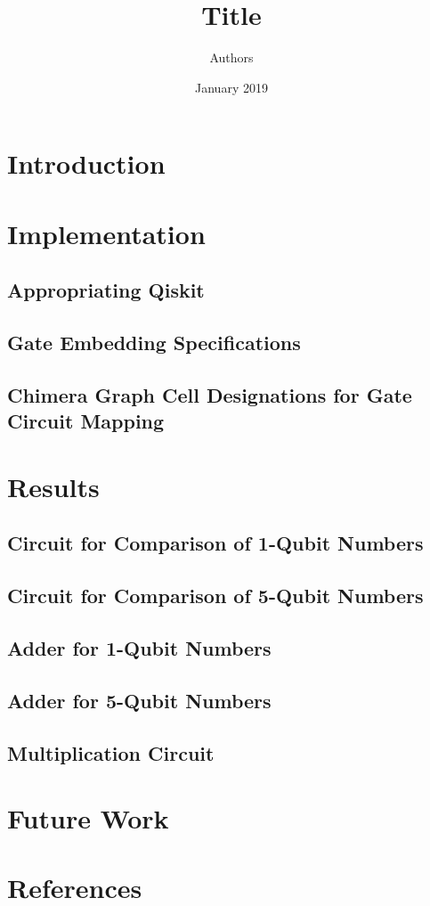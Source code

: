 \documentclass[12 pt, english]{article}
\title{Title}
\author{Authors}
\date{January 2019}
\begin{document}
\maketitle
\begin{abstract}

    
\end{abstract}
\section{Introduction}

\section{Implementation}
\subsection{Appropriating Qiskit}
\subsection{Gate Embedding Specifications}
\subsection{Chimera Graph Cell Designations for Gate Circuit Mapping}

\section{Results}

\subsection{Circuit for Comparison of 1-Qubit Numbers}

\subsection{Circuit for Comparison of 5-Qubit Numbers}

\subsection{Adder for 1-Qubit Numbers}

\subsection{Adder for 5-Qubit Numbers}

\subsection{Multiplication Circuit}

\section{Future Work}

\section{References}
\end{document}
